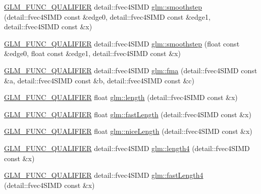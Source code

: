 \begin{DoxyCompactItemize}
\item 
\hyperlink{setup_8hpp_a33fdea6f91c5f834105f7415e2a64407}{G\+L\+M\+\_\+\+F\+U\+N\+C\+\_\+\+Q\+U\+A\+L\+I\+F\+I\+ER} detail\+::fvec4\+S\+I\+MD \hyperlink{namespaceglm_acaa3fe01372937d4ee7739ad87db0f15}{glm\+::smoothstep} (detail\+::fvec4\+S\+I\+MD const \&edge0, detail\+::fvec4\+S\+I\+MD const \&edge1, detail\+::fvec4\+S\+I\+MD const \&x)
\item 
\hyperlink{setup_8hpp_a33fdea6f91c5f834105f7415e2a64407}{G\+L\+M\+\_\+\+F\+U\+N\+C\+\_\+\+Q\+U\+A\+L\+I\+F\+I\+ER} detail\+::fvec4\+S\+I\+MD \hyperlink{namespaceglm_a38415c03c75a84267151b370d866e42e}{glm\+::smoothstep} (float const \&edge0, float const \&edge1, detail\+::fvec4\+S\+I\+MD const \&x)
\item 
\hyperlink{setup_8hpp_a33fdea6f91c5f834105f7415e2a64407}{G\+L\+M\+\_\+\+F\+U\+N\+C\+\_\+\+Q\+U\+A\+L\+I\+F\+I\+ER} detail\+::fvec4\+S\+I\+MD \hyperlink{namespaceglm_a3dd47df42a32adc14c604bed47633830}{glm\+::fma} (detail\+::fvec4\+S\+I\+MD const \&a, detail\+::fvec4\+S\+I\+MD const \&b, detail\+::fvec4\+S\+I\+MD const \&c)
\item 
\hyperlink{setup_8hpp_a33fdea6f91c5f834105f7415e2a64407}{G\+L\+M\+\_\+\+F\+U\+N\+C\+\_\+\+Q\+U\+A\+L\+I\+F\+I\+ER} float \hyperlink{namespaceglm_a65aff7dc68102a01ec2746d2c0c733c7}{glm\+::length} (detail\+::fvec4\+S\+I\+MD const \&x)
\item 
\hyperlink{setup_8hpp_a33fdea6f91c5f834105f7415e2a64407}{G\+L\+M\+\_\+\+F\+U\+N\+C\+\_\+\+Q\+U\+A\+L\+I\+F\+I\+ER} float \hyperlink{namespaceglm_ae8fababc16f402b8e518982eb08284ef}{glm\+::fast\+Length} (detail\+::fvec4\+S\+I\+MD const \&x)
\item 
\hyperlink{setup_8hpp_a33fdea6f91c5f834105f7415e2a64407}{G\+L\+M\+\_\+\+F\+U\+N\+C\+\_\+\+Q\+U\+A\+L\+I\+F\+I\+ER} float \hyperlink{namespaceglm_a34a9cfc7cf7fe9b35911cc3013033e61}{glm\+::nice\+Length} (detail\+::fvec4\+S\+I\+MD const \&x)
\item 
\hyperlink{setup_8hpp_a33fdea6f91c5f834105f7415e2a64407}{G\+L\+M\+\_\+\+F\+U\+N\+C\+\_\+\+Q\+U\+A\+L\+I\+F\+I\+ER} detail\+::fvec4\+S\+I\+MD \hyperlink{namespaceglm_a9de224e4659dd8df0f6cbfe87785ad37}{glm\+::length4} (detail\+::fvec4\+S\+I\+MD const \&x)
\item 
\hyperlink{setup_8hpp_a33fdea6f91c5f834105f7415e2a64407}{G\+L\+M\+\_\+\+F\+U\+N\+C\+\_\+\+Q\+U\+A\+L\+I\+F\+I\+ER} detail\+::fvec4\+S\+I\+MD \hyperlink{namespaceglm_a07438f3a62641a379456e932dd97b090}{glm\+::fast\+Length4} (detail\+::fvec4\+S\+I\+MD const \&x)
\item 

\end{DoxyCompactItemize}
